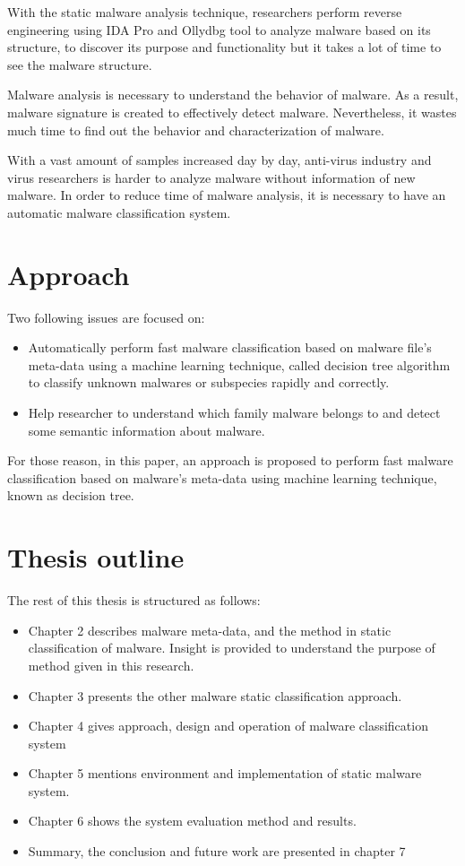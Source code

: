 With the static malware analysis technique, researchers perform reverse engineering using IDA Pro and Ollydbg tool to analyze malware based on its structure, to discover its purpose and functionality but it takes a lot of time to see the malware structure. 

Malware analysis is necessary to understand the behavior of malware. As a result, malware signature is created to effectively detect malware. Nevertheless, it wastes much time to find out the behavior and characterization of malware.

With a vast amount of samples increased day by day, anti-virus industry and virus researchers is harder to analyze malware without information of new malware. In order to reduce time of malware analysis, it is necessary to have an automatic malware classification system.

\section{Approach}

Two following issues are focused on:
\begin{itemize}
\item Automatically perform fast malware classification based on malware file's meta-data using a machine learning technique, called decision tree algorithm to classify unknown malwares or subspecies rapidly and correctly.
\item Help researcher to understand which family malware belongs to and detect some semantic information about malware. 
\end{itemize}

For those reason, in this paper, an approach is proposed to perform fast malware classification based on malware's meta-data using machine learning technique, known as decision tree.

\section{Thesis outline}
The rest of this thesis is structured as follows: \begin{itemize}
\item Chapter 2 describes malware meta-data, and the method in static classification of malware. Insight is provided to understand the purpose of method given in this research.
\item Chapter 3 presents the other malware static classification approach.
\item Chapter 4 gives approach, design and operation of malware classification system
\item Chapter 5 mentions environment and implementation of static malware system.
\item Chapter 6 shows the system evaluation method and results. 
\item Summary, the conclusion and future work are presented in chapter 7
\end{itemize}
